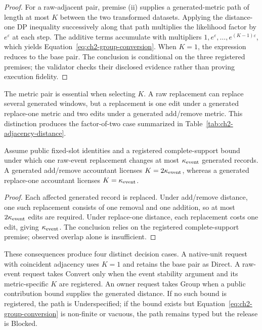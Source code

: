 \begin{proof}[Proof]
For a raw-adjacent pair, premise (ii) supplies a generated-metric path of length at
most \(K\) between the two transformed datasets.  Applying the distance-one DP
inequality successively along that path multiplies the likelihood factor by
\(e^{\varepsilon}\) at each step.  The additive terms accumulate with multipliers
\(1,e^{\varepsilon},\ldots,e^{(K-1)\varepsilon}\), which yields
Equation~\eqref{eq:ch2-group-conversion}.  When \(K=1\), the expression reduces to
the base pair.  The conclusion is conditional on the three registered premises;
the validator checks their disclosed evidence rather than proving execution
fidelity.
\end{proof}

The metric pair is essential when selecting \(K\).  A raw replacement can replace
several generated windows, but a replacement is one edit under a generated
replace-one metric and two edits under a generated add/remove metric.  This
distinction produces the factor-of-two case summarized in
Table~\ref{tab:ch2-adjacency-distance}.

\begin{corollary}
\label{cor:ch2-factor-two-mapping}
Assume public fixed-slot identities and a registered complete-support bound under
which one raw-event replacement changes at most \(\kappa_{\mathrm{event}}\) generated
records.  A generated add/remove accountant licenses
\(K=2\kappa_{\mathrm{event}}\), whereas a generated replace-one accountant licenses
\(K=\kappa_{\mathrm{event}}\).
\end{corollary}

\begin{proof}[Proof]
Each affected generated record is replaced.  Under add/remove distance, one such
replacement consists of one removal and one addition, so at most
\(2\kappa_{\mathrm{event}}\) edits are required.  Under replace-one distance, each
replacement costs one edit, giving \(\kappa_{\mathrm{event}}\).  The conclusion relies on
the registered complete-support premise; observed overlap alone is insufficient.
\end{proof}

These consequences produce four distinct decision cases.  A native-unit request
with coincident adjacency uses \(K=1\) and retains the base pair as
\textsf{Direct}.  A raw-event request takes \textsf{Convert} only when the event
stability argument and its metric-specific \(K\) are registered.  An owner request
takes \textsf{Group} when a public contribution bound supplies the generated
distance.  If no such bound is registered, the path is \textsf{Underspecified}; if
the bound exists but Equation~\eqref{eq:ch2-group-conversion} is non-finite or
vacuous, the path remains typed but the release is \textsf{Blocked}.

